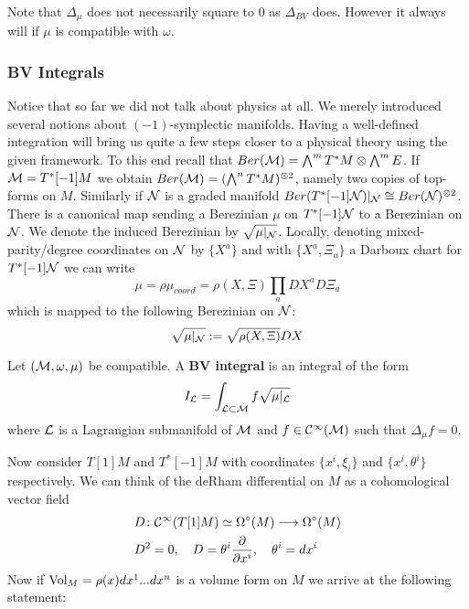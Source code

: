 \begin{rem}
  Note that $\Delta_\mu$ does not necessarily square to $0$ as $\Delta_{BV}$ does. However it always will if $\mu$ is compatible with $\omega$.
\end{rem}

\subsubsection{BV Integrals}
Notice that so far we did not talk about physics at all. We merely introduced several notions about $(-1)$-symplectic manifolds. Having a well-defined integration will bring us quite a few steps closer to a physical theory using the given framework. To this end recall that $Ber(\mathcal{M}) = \bigwedge^m T^* M \otimes \bigwedge^m E$. If $\mathcal{M} = T^*[-1] M$ we obtain $Ber(\mathcal{M}) = (\bigwedge^n T^*M)^{\otimes 2}$, namely two copies of top-forms on $M$. Similarly if $\mathcal{N}$ is a graded manifold $Ber(T^*[-1]\mathcal{N})|_{\mathcal{N}} \cong Ber(\mathcal{N})^{\otimes 2}$.\\


There is a canonical map sending a Berezinian $\mu$ on $T^*[-1]\mathcal{N}$ to a Berezinian on $\mathcal{N}$. We denote the induced Berezinian by $\sqrt{\mu|_{\mathcal{N}}}$. Locally, denoting mixed-parity/degree coordinates on $\mathcal{N}$ by $\{X^a\}$ and with $\{X^a, \Xi_a \}$ a Darboux chart for $T^*[-1]\mathcal{N}$ we can write
\begin{equation}
  \mu = \rho \mu_{coord} = \rho(X, \Xi) \prod_a DX^a D\Xi_a
\end{equation}
which is mapped to the following Berezinian on $\mathcal{N}$:
\begin{equation}
  \sqrt{\mu|_{\mathcal{N}}} := \sqrt{\rho(X, \Xi)} DX
\end{equation}

\begin{definition}[BV Integral]
  Let $(\mathcal{M}, \omega, \mu)$ be compatible. A \textbf{BV integral} is an integral of the form
  \begin{equation}
    I_{\mathcal{L}} = \int_{\mathcal{L} \subset \mathcal{M}} f \sqrt{\mu|_{\mathcal{L}}}
  \end{equation}
  where $\mathcal{L}$ is a Lagrangian submanifold of $\mathcal{M}$ and $f \in \mathcal{C}^{\infty}(\mathcal{M})$ such that $\Delta_\mu f = 0$.
\end{definition}

Now consider $T[1]M$ and $T^*[-1]M$ with coordinates $\{x^i, \xi_i \}$ and $\{x^i, \theta^i \}$ respectively. We can think of the deRham differential on $M$ as a cohomological vector field
\begin{align}
  &D \colon \mathcal{C}^{\infty}(T[1]M) \simeq \Omega^\circ(M) \longrightarrow \Omega^\circ(M) \\
  &D^2 = 0, \quad D = \theta^i \frac{\partial }{\partial x^i}, \quad \theta^i = dx^i
\end{align}
Now if $\operatorname{Vol}_M = \rho(x) dx^1 ... dx^n$ is a volume form on $M$ we arrive at the following statement:

